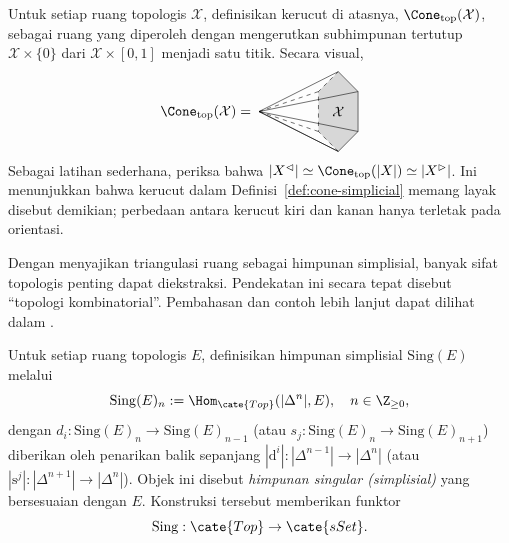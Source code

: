\begin{example}\label{eg:cone-realization}
	Untuk setiap ruang topologis $\mathcal{X}$, definisikan kerucut di atasnya,
	$\Cone_{\mathrm{top}}(\mathcal{X})$, sebagai ruang yang
	diperoleh dengan mengerutkan subhimpunan tertutup
	$\mathcal{X}\times\{0\}$ dari $\mathcal{X}\times[0,1]$ menjadi satu
	titik. Secara visual,
	\[\Cone_{\mathrm{top}}(\mathcal{X}) = \; \begin{tikzpicture}[baseline=(P)]
		\coordinate (A) at (0, 1);
		\coordinate (B) at (0.5, 0.5);
		\coordinate (C) at (0.5, -0.5);
		\coordinate (D) at (0, -1);
		\coordinate (E) at (-0.5, -0.5);
		\coordinate (F) at (-0.5, 0.5);
		\coordinate (O) at (-2, 0);
		\coordinate (P) at (0, -0.1);	%

		\fill[gray!50, opacity=0.6] (A) -- (B) -- (C) -- (D) -- (E) -- (F) --cycle;
		\draw (O) -- (A) -- (B) -- (C) -- (D) --cycle;
		\draw (O) -- (B);
		\draw (O) -- (C);
		\draw (O) -- (D);
		\draw[dashed] (D) -- (E) -- (F) -- (A);
		\draw[dashed] (O) -- (E);
		\draw[dashed] (O) -- (F);
		\node at (0, 0) {$\mathcal{X}$};
	\end{tikzpicture}\]
	Sebagai latihan sederhana, periksa bahwa
	$|X^{\lhd}|\simeq\Cone_{\mathrm{top}}(|X|)\simeq|X^{\rhd}|$. Ini
	menunjukkan bahwa kerucut dalam Definisi~\ref{def:cone-simplicial} memang
	layak disebut demikian; perbedaan antara kerucut kiri dan kanan hanya
	terletak pada orientasi.
\end{example}

Dengan menyajikan triangulasi ruang sebagai himpunan simplisial, banyak sifat
topologis penting dapat diekstraksi. Pendekatan ini secara tepat disebut
``topologi kombinatorial''. Pembahasan dan contoh lebih lanjut dapat dilihat
dalam \cite[Bab VI]{You}.

\begin{definition}
	Untuk setiap ruang topologis $E$, definisikan himpunan simplisial
	$\mathrm{Sing}(E)$ melalui
	\[ \mathrm{Sing}(E)_n := \Hom_{\cate{Top}}(|\Delta^n|, E), \quad n \in \Z_{\geq 0}, \]
	dengan $d_i:\mathrm{Sing}(E)_n\to\mathrm{Sing}(E)_{n-1}$ (atau
	$s_j:\mathrm{Sing}(E)_n\to\mathrm{Sing}(E)_{n+1}$) diberikan oleh
	penarikan balik sepanjang
	$|\mathrm{d}^i|:|\Delta^{n-1}|\to|\Delta^n|$ (atau
	$|\mathrm{s}^j|:|\Delta^{n+1}|\to|\Delta^n|$). Objek ini disebut
	\emph{himpunan singular (simplisial)} yang bersesuaian dengan $E$.
	Konstruksi tersebut memberikan funktor
	\[ \mathrm{Sing}: \cate{Top} \to \cate{sSet}. \]
\end{definition}


